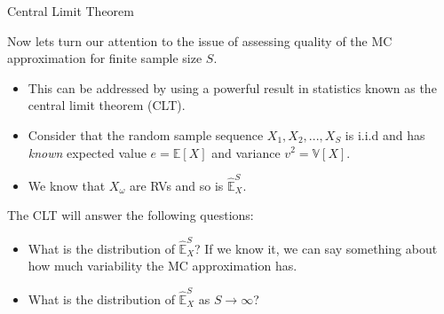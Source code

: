\documentclass[9pt]{beamer}
\begin{document}
%
\begin{frame}{Central Limit Theorem}

Now lets turn our attention to the issue of assessing quality of the MC approximation for finite sample size $S$. 
\begin{itemize}
\item This can be addressed by using a powerful result in statistics known as the central limit theorem (CLT). 
\item Consider that the random sample sequence $X_1,X_2,...,X_S$ is i.i.d and has {\em known} expected value $e=\mathbb{E}[X]$ and variance $v^2=\mathbb{V}[X]$. 

\item We know that $X_\omega$ are RVs and so is $\hat{\mathbb{E}}_X^S$. 
\end{itemize}

The CLT will answer the following questions:
\begin{block}{}
\begin{itemize}
\item What is the distribution of $\hat{\mathbb{E}}_X^S$? If we know it, we can say something about how much variability the MC  approximation has. 

\item What is the distribution of $\hat{\mathbb{E}}_X^S$ as $S\to \infty$? 
\end{itemize}
\end{block}

\end{frame}
\end{document}
